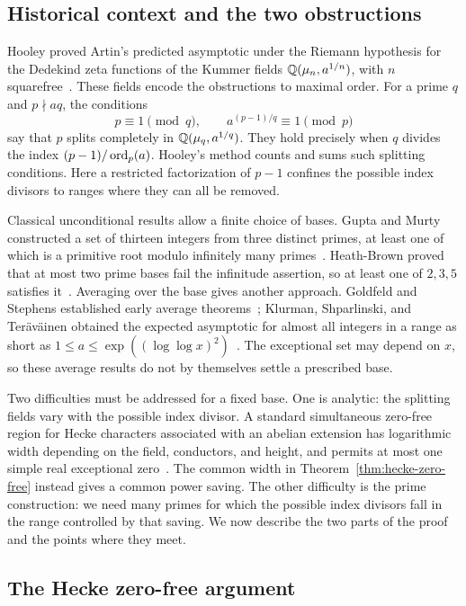 \subsection{Historical context and the two obstructions}

Hooley proved Artin's predicted asymptotic under the Riemann hypothesis
for the Dedekind zeta functions of the Kummer fields
$\mathbb{Q}(\mu_n,a^{1/n})$, with $n$ squarefree~\cite{Hooley67}.
These fields encode the obstructions to maximal order. For a prime
$q$ and $p\nmid aq$, the conditions
\[
 p\equiv1\pmod q,\qquad a^{(p-1)/q}\equiv1\pmod p
\]
say that $p$ splits completely in $\mathbb{Q}(\mu_q,a^{1/q})$.
They hold precisely when $q$ divides the index
$(p-1)/\operatorname{ord}_p(a)$. Hooley's method counts and sums such splitting
conditions. Here a restricted factorization of $p-1$ confines the
possible index divisors to ranges where they can all be removed.

Classical unconditional results allow a finite choice of bases.
Gupta and Murty constructed a set of thirteen integers from three
distinct primes, at least one of which is a primitive root modulo
infinitely many primes~\cite{GuptaMurty84}. Heath-Brown proved that
at most two prime bases fail the infinitude assertion, so at least
one of $2,3,5$ satisfies it~\cite{HeathBrown86}.
Averaging over the base gives another approach. Goldfeld and Stephens
established early average theorems~\cite{Goldfeld68,Stephens69};
Klurman, Shparlinski, and Ter\"av\"ainen obtained the expected
asymptotic for almost all integers in a range as short as
$1\le a\le\exp((\log\log x)^2)$~\cite{KlurmanShparlinskiTeravainen25}.
The exceptional set may depend on $x$, so these average results
do not by themselves settle a prescribed base.

Two difficulties must be addressed for a fixed base. One is analytic:
the splitting fields vary with the possible index divisor. A standard
simultaneous zero-free region for Hecke characters associated with
an abelian extension has logarithmic width depending on the field,
conductors, and height, and permits at most one simple real
exceptional zero~\cite[Theorem~3.1]{ThornerZaman19}.
The common width in Theorem~\ref{thm:hecke-zero-free} instead gives
a common power saving. The other difficulty is the prime construction:
we need many primes for which the possible index divisors fall in
the range controlled by that saving. We now describe the two parts
of the proof and the points where they meet.

\subsection{The Hecke zero-free argument}


